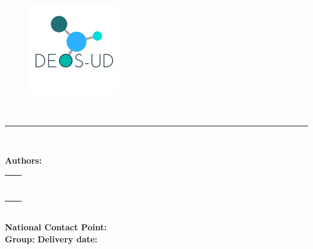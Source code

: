 \begin{center}
\begin{figure}[!tbp]
    \centering
         \includegraphics[width=0.35\textwidth]{./doc_config/images/logo2.png}
\end{figure}

\vspace{2cm}

{\fontsize{25pt}{20pt}\selectfont \ProjectName}\\ \vspace{0.3cm}
{\fontsize{22pt}{20pt}\selectfont \ProjectsubName}


\vspace{10pt}



\textcolor{UPC_blue}{\rule{\textwidth}{.6pt}}

{\Large \DocTypeI}\\
{\Large \DocTypeII}

\end{center}

\vspace{20pt}

\textbf{Authors:}\vspace{7pt}

\begin{tabular}{ll}
	\Studi    \hspace*{30pt} & \Studix   \\
	\Studii   \hspace*{30pt} & \Studx   \\
	\Studiii  \hspace*{30pt} & \Studxi   \\
	\Studiv   \hspace*{30pt} & \Studxii \\
	\Studv    \hspace*{30pt} & \Studxiii    \\
	\Studvi   \hspace*{30pt} & \Studxiv  \\
	\Studvii  \hspace*{30pt} & \Studxv  \\
	\Studviii \hspace*{30pt} & \Studxvi  \\
\end{tabular}\\

\vspace{10pt}
\textbf{National Contact Point:} \Director\\

\vspace{10pt}
\textbf{Group:} \Group \hspace*{160pt} \textbf{Delivery date:} \DocDate
